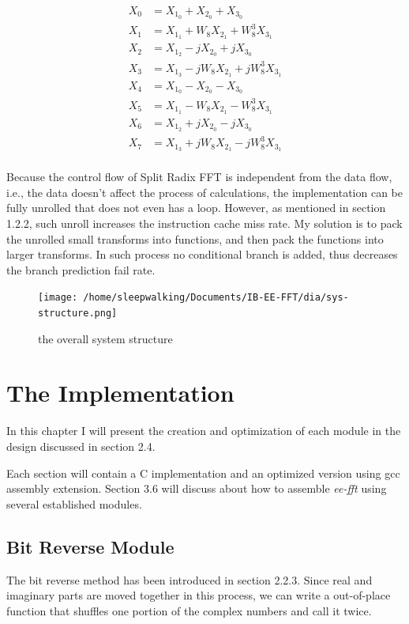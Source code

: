 \documentclass[a4paper]{report}
\begin{document}
\[\begin{split}
  X_{0} & = X_{1_0} + X_{2_0} + X_{3_0}\\
  X_{1} & = X_{1_1} + W_8 X_{2_1} + W_8^3 X_{3_1}\\
  X_{2} & = X_{1_2} - jX_{2_0} + j X_{3_0}\\
  X_{3} & = X_{1_3} - jW_8 X_{2_1} + jW_8^3 X_{3_1}\\
  X_{4} & = X_{1_0} - X_{2_0} - X_{3_0}\\
  X_{5} & = X_{1_1} - W_8 X_{2_1} - W_8^3 X_{3_1}\\
  X_{6} & = X_{1_2} + jX_{2_0} - jX_{3_0}\\
  X_{7} & = X_{1_3} + jW_8 X_{2_1} - jW_8^3 X_{3_1}\\
\end{split}\]

	Because the control flow of Split Radix FFT is independent from the data flow, i.e., the data doesn't affect the process of calculations, the implementation can be fully unrolled that does not even has a loop. However, as mentioned in section 1.2.2, such unroll increases the instruction cache miss rate. My solution is to pack the unrolled small transforms into functions, and then pack the functions into larger transforms. In such process no conditional branch is added, thus decreases the branch prediction fail rate.

\begin{figure}[htp]
\centering
\texttt{[image: /home/sleepwalking/Documents/IB-EE-FFT/dia/sys-structure.png]}
\caption{the overall system structure}
\label{}
\end{figure}
\chapter{The Implementation} \indent

	In this chapter I will present the creation and optimization of each module in the design discussed in section 2.4.
	
	Each section will contain a C implementation and an optimized version using gcc assembly extension. Section 3.6 will discuss about how to assemble \textit{ee-fft} using several established modules.

\section{Bit Reverse Module} \indent

	The bit reverse method has been introduced in section 2.2.3. Since real and imaginary parts are moved together in this process, we can write a out-of-place function that shuffles one portion of the complex numbers and call it twice.
	
\end{document}
